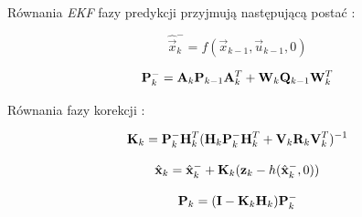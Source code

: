 Równania \textit{EKF} fazy predykcji przyjmują następującą postać \cite{Welch1995}:

\begin{equation}
\label{equ:Rozszerzony_Filtr_Kalmana_faza_predykcji_stan}
	\hat{\vec{x}}_k^- = f(\vec{x}_{k-1}, \vec{u}_{k-1}, 0)
\end{equation}

\begin{equation}
\label{equ:Rozszerzony_Filtr_Kalmana_faza_predykcji_macierz_kowariancji_bledow}
	\mathbf{P}_k^- = \mathbf{A}_k \mathbf{P}_{k-1} \mathbf{A}_k^T + \mathbf{W}_k\mathbf{Q}_{k-1}\mathbf{W}_k^T
\end{equation}

Równania fazy korekcji \cite{Welch1995}:

\begin{equation}
\label{equ:Rozszerzony_Filtr_Kalmana_faza_korekcji_wzmocnienie}
	\mathbf{K}_k = \mathbf{P}_k^- \mathbf{H}_k^T ( \mathbf{H}_k \mathbf{P}_k^- \mathbf{H}_k^T + \mathbf{V}_k\mathbf{R}_k\mathbf{V}_k^T ) ^ {-1}
\end{equation}

\begin{equation}
\label{equ:Rozszerzony_Filtr_Kalmana_faza_korekcji_stan}
	\hat{\vec{x}}_k = \hat{\vec{x}}_k^- + \matr{K}_k(\vec{z}_k - h(\hat{\vec{x}}_k^-,0))
\end{equation}

\begin{equation}
\label{equ:Rozszerzony_Filtr_Kalmana_faza_korekcji_macierz_kowariancji_bledow}
	\mathbf{P}_k = (\mathbf{I} - \mathbf{K}_k \mathbf{H}_k) \mathbf{P}_k^-
\end{equation}